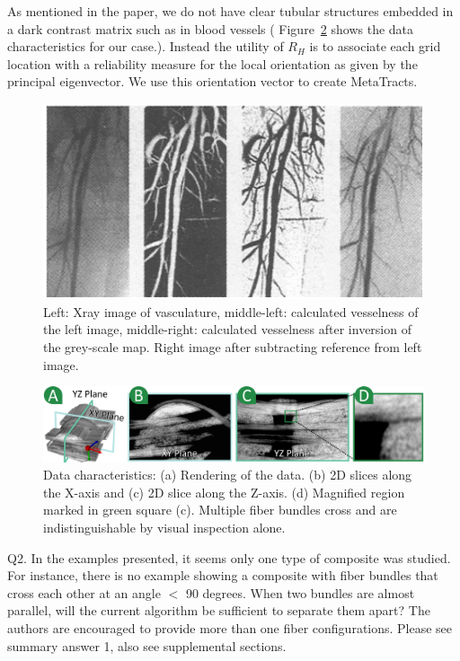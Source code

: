 \documentclass[]{article}
\begin{document}
As mentioned in the paper, we do not have clear tubular structures embedded in a dark contrast matrix such as in blood vessels ( Figure~\ref{fig:data-char-rebuttal} shows the data characteristics for our case.). Instead  the utility of $R_{H}$ is  to associate each grid location with a reliability measure for the local orientation as given by the  principal eigenvector. We use this orientation vector to create MetaTracts.

\begin{figure}
\centering
\includegraphics[width=0.7\linewidth]{images_pvis/Vesselness}
\caption{Left: Xray image of vasculature, middle-left: calculated vesselness of the left image, middle-right: calculated vesselness after inversion of the grey-scale map. Right image after subtracting reference from left image.}
\label{fig:Vesselness}
\end{figure}

\begin{figure}[tb]
	\centering
	\includegraphics[width=\linewidth]{images_pvis/data-char.pdf}
	\caption{Data characteristics: (a) Rendering of the data. (b) 2D slices along the X-axis and (c) 2D slice along the Z-axis. (d) Magnified region marked in green square (c). Multiple fiber bundles cross and are indistinguishable by visual inspection alone. }
	\label{fig:data-char-rebuttal}
\end{figure}

\color{red}
Q2. In the examples presented, it seems only one type of composite was studied. For instance, there is no example showing a composite with fiber bundles that cross each other at an angle $<$ 90 degrees. When two bundles are almost parallel, will the current algorithm be sufficient to separate them apart? The authors are encouraged to provide more than one fiber configurations.
\color{black}
Please see summary answer 1, also see supplemental sections.  
\end{document}
